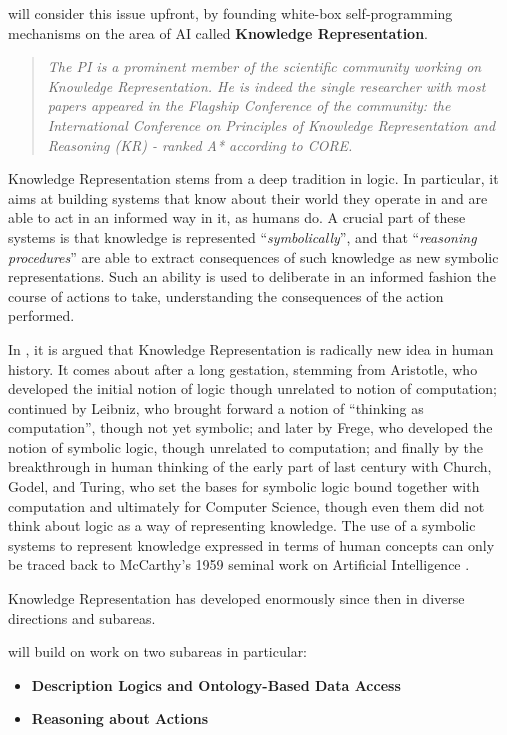 \project will consider this issue upfront, by founding white-box self-programming mechanisms on the area of AI called \textbf{Knowledge Representation}. 

\begin{quote}\it
The PI is  a prominent member of the scientific community working on Knowledge Representation. He is indeed the single researcher with most papers appeared in the Flagship Conference of the community: the International Conference on Principles of Knowledge Representation and Reasoning (KR) - ranked A* according to CORE.
\end{quote}


Knowledge Representation stems from a deep
tradition in logic. In particular, it aims at building systems that
know about their world they operate in and are able to act in an informed way in it,
as humans do.
A crucial part of these systems is that knowledge is represented
``\emph{symbolically}'', and that ``\emph{reasoning procedures}'' are able to extract
consequences of such knowledge as new symbolic representations. Such
an ability is used to deliberate in an informed fashion the course of
actions to take, understanding the consequences of the action performed.

In \cite{Leve14,Leve17}, it is argued that Knowledge Representation is
radically new idea in human history. It comes about after a long
gestation, stemming from Aristotle, who developed the initial notion
of logic though unrelated to notion of computation; continued by
Leibniz, who brought forward a notion of ``thinking as computation'',
though not yet symbolic; and later by Frege, who developed the notion
of symbolic logic, though unrelated to computation; and finally by the
breakthrough in human thinking of the early part of last century with
Church, Godel, and Turing, who set the bases for symbolic logic bound
together with computation and ultimately for Computer Science, though
even them did not think about logic as a way of representing
knowledge. The use of a symbolic systems to represent knowledge
expressed in terms of human concepts can only be traced back to
McCarthy's 1959 seminal work on Artificial Intelligence \cite{McCa57}.

Knowledge Representation has developed enormously since then in
diverse directions and subareas. 

\project will build on work on two subareas in particular:
\begin{itemize}
\item \textbf{Description Logics and Ontology-Based Data Access}
\item \textbf{Reasoning about Actions}
\end{itemize}

